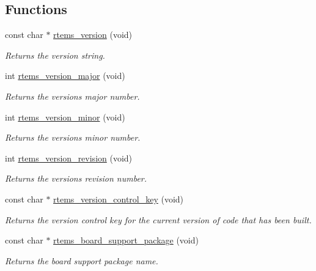 \subsection*{Functions}
\begin{DoxyCompactItemize}
\item 
const char $\ast$ \mbox{\hyperlink{group__RTEMSAPIClassicVersion_ga3ca3bbb5a6913803c8e50389465d63c5}{rtems\+\_\+version}} (void)
\begin{DoxyCompactList}\small\item\em Returns the version string. \end{DoxyCompactList}\item 
int \mbox{\hyperlink{group__RTEMSAPIClassicVersion_ga076be33a4a45e0805019c4f0282a605f}{rtems\+\_\+version\+\_\+major}} (void)
\begin{DoxyCompactList}\small\item\em Returns the version\textquotesingle{}s major number. \end{DoxyCompactList}\item 
int \mbox{\hyperlink{group__RTEMSAPIClassicVersion_ga8bb5b05eaf8e6d8b8aaa3138640c4fb9}{rtems\+\_\+version\+\_\+minor}} (void)
\begin{DoxyCompactList}\small\item\em Returns the version\textquotesingle{}s minor number. \end{DoxyCompactList}\item 
int \mbox{\hyperlink{group__RTEMSAPIClassicVersion_ga29c105b01e8444e19e43588ed1a55a52}{rtems\+\_\+version\+\_\+revision}} (void)
\begin{DoxyCompactList}\small\item\em Returns the version\textquotesingle{}s revision number. \end{DoxyCompactList}\item 
const char $\ast$ \mbox{\hyperlink{group__RTEMSAPIClassicVersion_ga77f6606b59bca0909f665e6280ee5b2f}{rtems\+\_\+version\+\_\+control\+\_\+key}} (void)
\begin{DoxyCompactList}\small\item\em Returns the version control key for the current version of code that has been built. \end{DoxyCompactList}\item 
const char $\ast$ \mbox{\hyperlink{group__RTEMSAPIClassicVersion_gaf80467bcb26ae0c1241e126b251bceed}{rtems\+\_\+board\+\_\+support\+\_\+package}} (void)
\begin{DoxyCompactList}\small\item\em Returns the board support package name. \end{DoxyCompactList}\end{DoxyCompactItemize}


